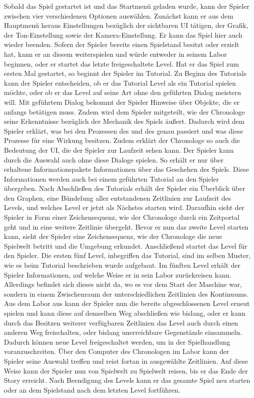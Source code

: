 Sobald das Spiel gestartet ist und das Startmenü geladen wurde, kann der Spieler zwischen vier verschiedenen Optionen auswählen. Zunächst kann er aus dem Hauptmenü heraus Einstellungen bezüglich der sichtbaren \ac{UI} tätigen, der Grafik, der Ton-Einstellung sowie der Kamera-Einstellung. Er kann das Spiel hier auch wieder beenden. Sofern der Spieler bereits einen Spielstand besitzt oder erzielt hat, kann er an diesem weiterspielen und würde entweder in seinem Labor beginnen, oder er startet das letzte freigeschaltete Level. Hat er das Spiel zum ersten Mal gestartet, so beginnt der Spieler im Tutorial. Zu Beginn des Tutorials kann der Spieler entscheiden, ob er das Tutorial Level als ein Tutorial spielen möchte, oder ob er das Level auf seine Art ohne den geführten Dialog meistern will. Mit geführtem Dialog bekommt der Spieler Hinweise über Objekte, die er anfangs betätigen muss. Zudem wird dem Spieler mitgeteilt, wie der Chronologe seine Erkenntnisse bezüglich der Mechanik des Spiels äußert. Dadurch wird dem Spieler erklärt, was bei den Prozessen des  und des  genau passiert und was diese Prozesse für eine Wirkung besitzen. Zudem erklärt der Chronologe so auch die Bedeutung der \ac{UI}, die der Spieler zur Laufzeit sehen kann. Der Spieler kann durch die Auswahl auch ohne diese Dialoge spielen. So erhält er nur über erhaltene Informationspakete Informationen über das Geschehen des Spiels. Diese Informationen werden auch bei einem geführten Tutorial an den Spieler übergeben.
Nach Abschließen des Tutorials erhält der Spieler ein Überblick über den Graphen, eine Bündelung aller entstandenen Zeitlinien zur Laufzeit des Levels, und welches Level er jetzt als Nächstes starten wird. Daraufhin sieht der Spieler in Form einer Zeichensequenz, wie der Chronologe durch ein Zeitportal geht und in eine weitere Zeitlinie übergeht. Bevor er nun das zweite Level starten kann, sieht der Spieler eine Zeichensequenz, wie der Chronologe die neue Spielwelt betritt und die Umgebung erkundet. Anschließend startet das Level für den Spieler. Die ersten fünf Level, inbegriffen das Tutorial, sind im selben Muster, wie es beim Tutorial beschrieben wurde aufgebaut. Im fünften Level erhält der Spieler Informationen, auf welche Weise er in sein Labor zurückreisen kann. Allerdings befindet sich dieses nicht da, wo es vor dem Start der Maschine war, sondern in einem Zwischenraum der unterschiedlichen Zeitlinien des Kontinuums. Aus dem Labor aus kann der Spieler nun die bereits abgeschlossenen Level erneut spielen und kann diese auf demselben Weg abschließen wie bislang, oder er kann durch das Besitzen weiterer verfügbaren Zeitlinien das Level auch durch einen anderen Weg freischalten, oder bislang unerreichbare Gegenstände einsammeln. Dadurch können neue Level freigeschaltet werden, um in der Spielhandlung voranzuschreiten. Über den Computer des Chronologen im Labor kann der Spieler seine Auswahl treffen und reist fortan in ausgewählte Zeitlinien. Auf diese Weise kann der Spieler nun von Spielwelt zu Spielwelt reisen, bis er das Ende der Story erreicht. Nach Beendigung des Levels kann er das gesamte Spiel neu starten oder an dem Spielstand nach dem letzten Level fortführen.


